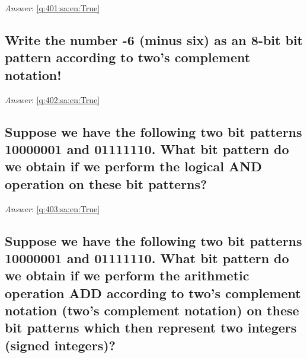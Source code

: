 \documentclass[a4paper,11pt,oneside]{article}
\begin{document}
\begin{sloppypar}
\noindent\makebox[\textwidth]{\hrulefill}

\vspace{1cm}

\textit{Answer}: \autoref{q:401:sa:en:True}



\subsection{Write the number -6 (minus six) as an 8-bit bit pattern according to two's complement notation!}

\label{q:402:sa:en:False}

\vspace{2cm}

\noindent\makebox[\textwidth]{\hrulefill}

\vspace{1cm}

\textit{Answer}: \autoref{q:402:sa:en:True}



\subsection{Suppose we have the following two bit patterns 10000001 and 01111110. What bit pattern do we obtain if we perform the logical AND operation on these bit patterns?}

\label{q:403:sa:en:False}

\vspace{2cm}

\noindent\makebox[\textwidth]{\hrulefill}

\vspace{1cm}

\textit{Answer}: \autoref{q:403:sa:en:True}



\subsection{Suppose we have the following two bit patterns 10000001 and 01111110. What bit pattern do we obtain if we perform the arithmetic operation ADD according to two's complement notation (two's complement notation) on these bit patterns which then represent two integers (signed integers)?}

\label{q:404:sa:en:False}

\vspace{2cm}

\noindent\makebox[\textwidth]{\hrulefill}


\end{sloppypar}
\end{document}
